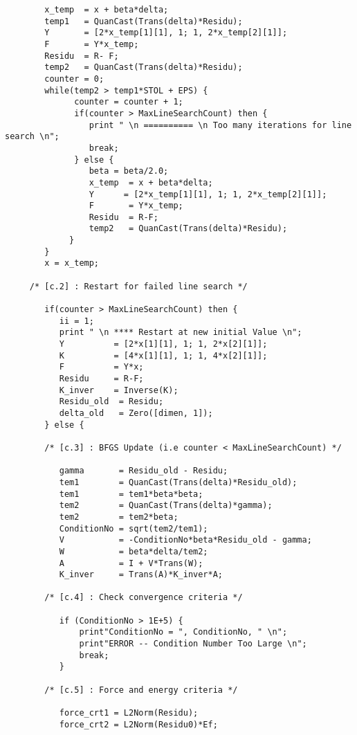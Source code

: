 \begin{footnotesize}
\begin{verbatim}
        x_temp  = x + beta*delta; 
        temp1   = QuanCast(Trans(delta)*Residu); 
        Y       = [2*x_temp[1][1], 1; 1, 2*x_temp[2][1]];
        F       = Y*x_temp;
        Residu  = R- F;
        temp2   = QuanCast(Trans(delta)*Residu); 
        counter = 0;
        while(temp2 > temp1*STOL + EPS) {
              counter = counter + 1;
              if(counter > MaxLineSearchCount) then {
                 print " \n ========== \n Too many iterations for line search \n";
                 break;
              } else {
                 beta = beta/2.0;
                 x_temp  = x + beta*delta;
                 Y      = [2*x_temp[1][1], 1; 1, 2*x_temp[2][1]];
                 F       = Y*x_temp;
                 Residu  = R-F;
                 temp2   = QuanCast(Trans(delta)*Residu);
             }
        }
        x = x_temp;

     /* [c.2] : Restart for failed line search */

        if(counter > MaxLineSearchCount) then {
           ii = 1;
           print " \n **** Restart at new initial Value \n";
           Y          = [2*x[1][1], 1; 1, 2*x[2][1]];
           K          = [4*x[1][1], 1; 1, 4*x[2][1]];
           F          = Y*x;
           Residu     = R-F;
           K_inver    = Inverse(K);
           Residu_old  = Residu;
           delta_old   = Zero([dimen, 1]);
        } else { 

        /* [c.3] : BFGS Update (i.e counter < MaxLineSearchCount) */

           gamma       = Residu_old - Residu;
           tem1        = QuanCast(Trans(delta)*Residu_old);
           tem1        = tem1*beta*beta;
           tem2        = QuanCast(Trans(delta)*gamma);
           tem2        = tem2*beta;
           ConditionNo = sqrt(tem2/tem1);
           V           = -ConditionNo*beta*Residu_old - gamma;
           W           = beta*delta/tem2;
           A           = I + V*Trans(W);
           K_inver     = Trans(A)*K_inver*A;

        /* [c.4] : Check convergence criteria */

           if (ConditionNo > 1E+5) {
               print"ConditionNo = ", ConditionNo, " \n";
               print"ERROR -- Condition Number Too Large \n";
               break;
           }

        /* [c.5] : Force and energy criteria */

           force_crt1 = L2Norm(Residu);
           force_crt2 = L2Norm(Residu0)*Ef;


\end{verbatim}
\end{footnotesize}
